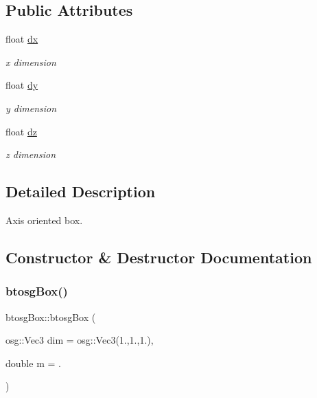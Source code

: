 \subsection*{Public Attributes}
\begin{DoxyCompactItemize}
\item 
\mbox{\label{classbtosgBox_a1d1e4744d9e377e1462ea097dacef716}} 
float \hyperlink{classbtosgBox_a1d1e4744d9e377e1462ea097dacef716}{dx}
\begin{DoxyCompactList}\small\item\em x dimension \end{DoxyCompactList}\item 
\mbox{\label{classbtosgBox_a7665337187adb52a1ce3b4cf2819217d}} 
float \hyperlink{classbtosgBox_a7665337187adb52a1ce3b4cf2819217d}{dy}
\begin{DoxyCompactList}\small\item\em y dimension \end{DoxyCompactList}\item 
\mbox{\label{classbtosgBox_a1dd905f6afb684d5d364f2b211dbab97}} 
float \hyperlink{classbtosgBox_a1dd905f6afb684d5d364f2b211dbab97}{dz}
\begin{DoxyCompactList}\small\item\em z dimension \end{DoxyCompactList}\end{DoxyCompactItemize}


\subsection{Detailed Description}
Axis oriented box. 

\subsection{Constructor \& Destructor Documentation}
\mbox{\label{classbtosgBox_a7b899d77d6ce1cd9fd1a506219814c2c}} 
\subsubsection{\texorpdfstring{btosg\+Box()}{btosgBox()}\hspace{0.1cm}{\footnotesize\ttfamily [1/3]}}
{\footnotesize\ttfamily btosg\+Box\+::btosg\+Box (\begin{DoxyParamCaption}\item[{osg\+::\+Vec3}]{dim = {\ttfamily osg\+:\+:Vec3(1.,1.,1.)},  }\item[{double}]{m = {.} }\end{DoxyParamCaption})\hspace{0.3cm}{\ttfamily [inline]}}

